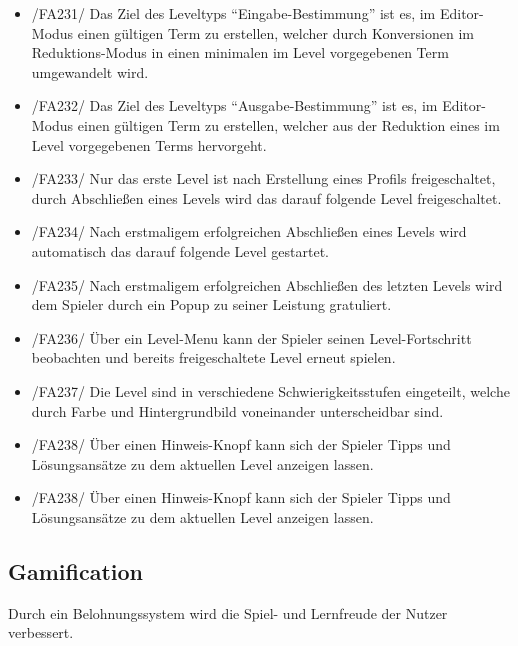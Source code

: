 \begin{itemize}
\item /FA231/ Das Ziel des Leveltyps "`Eingabe-Bestimmung"' ist es, im Editor-Modus einen gültigen Term zu erstellen, welcher durch Konversionen im Reduktions-Modus in einen minimalen im Level vorgegebenen Term umgewandelt wird.
\item /FA232/ Das Ziel des Leveltyps "`Ausgabe-Bestimmung"' ist es, im Editor-Modus einen gültigen Term zu erstellen, welcher aus der Reduktion eines im Level vorgegebenen Terms hervorgeht.
\item /FA233/ Nur das erste Level ist nach Erstellung eines Profils freigeschaltet, durch Abschließen eines Levels wird das darauf folgende Level freigeschaltet.
\item /FA234/ Nach erstmaligem erfolgreichen Abschließen eines Levels wird automatisch das darauf folgende Level gestartet.
\item /FA235/ Nach erstmaligem erfolgreichen Abschließen des letzten Levels wird dem Spieler durch ein Popup zu seiner Leistung gratuliert.
\item /FA236/ Über ein Level-Menu kann der Spieler seinen Level-Fortschritt beobachten und bereits freigeschaltete Level erneut spielen.
\item /FA237/ Die Level sind in verschiedene Schwierigkeitsstufen eingeteilt, welche durch Farbe und Hintergrundbild voneinander unterscheidbar sind.
\item /FA238/ Über einen Hinweis-Knopf kann sich der Spieler Tipps und Lösungsansätze zu dem aktuellen Level anzeigen lassen.
\item /FA238/ Über einen Hinweis-Knopf kann sich der Spieler Tipps und Lösungsansätze zu dem aktuellen Level anzeigen lassen.
\end{itemize}

\subsection{Gamification}

Durch ein Belohnungssystem wird die Spiel- und Lernfreude der Nutzer verbessert.

